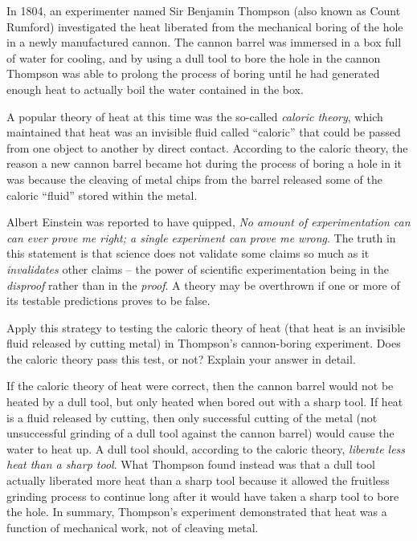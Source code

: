 

In 1804, an experimenter named Sir Benjamin Thompson (also known as Count Rumford) investigated the heat liberated from the mechanical boring of the hole in a newly manufactured cannon.  The cannon barrel was immersed in a box full of water for cooling, and by using a dull tool to bore the hole in the cannon Thompson was able to prolong the process of boring until he had generated enough heat to actually boil the water contained in the box.

\vskip 10pt

A popular theory of heat at this time was the so-called {\it caloric theory}, which maintained that heat was an invisible fluid called ``caloric'' that could be passed from one object to another by direct contact.  According to the caloric theory, the reason a new cannon barrel became hot during the process of boring a hole in it was because the cleaving of metal chips from the barrel released some of the caloric ``fluid'' stored within the metal.

\vskip 10pt

Albert Einstein was reported to have quipped, {\it No amount of experimentation can can ever prove me right; a single experiment can prove me wrong}.  The truth in this statement is that science does not validate some claims so much as it {\it invalidates} other claims -- the power of scientific experimentation being in the {\it disproof} rather than in the {\it proof}.  A theory may be overthrown if one or more of its testable predictions proves to be false.  

Apply this strategy to testing the caloric theory of heat (that heat is an invisible fluid released by cutting metal) in Thompson's cannon-boring experiment.  Does the caloric theory pass this test, or not?  Explain your answer in detail.







If the caloric theory of heat were correct, then the cannon barrel would not be heated by a dull tool, but only heated when bored out with a sharp tool.  If heat is a fluid released by cutting, then only successful cutting of the metal (not unsuccessful grinding of a dull tool against the cannon barrel) would cause the water to heat up.  A dull tool should, according to the caloric theory, {\it liberate less heat than a sharp tool}.  What Thompson found instead was that a dull tool actually liberated more heat than a sharp tool because it allowed the fruitless grinding process to continue long after it would have taken a sharp tool to bore the hole.  In summary, Thompson's experiment demonstrated that heat was a function of mechanical work, not of cleaving metal.
 










